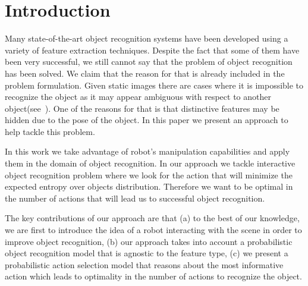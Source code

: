 \section{Introduction}


    Many state-of-the-art object recognition systems have been developed using a variety of feature extraction techniques. Despite the fact that some of them have been very successful, we still cannot say that the problem of object recognition has been solved. We claim that the reason for that is already included in the problem formulation. Given static images there are cases where it is impossible to recognize the object as it may appear ambiguous with respect to another object(see~). One of the reasons for that is that distinctive features may be hidden due to the pose of the object.  In this paper we present an approach to help tackle this problem.
    
    In this work we take advantage of robot's manipulation capabilities and apply them in the domain of object recognition. In our approach we tackle interactive object recognition problem where we look for the action that will minimize the expected entropy over objects distribution. Therefore we want to be optimal in the number of actions that will lead us to successful object recognition.

    The key contributions of our approach are that (a) to the best of our knowledge, we are first to introduce the idea of a robot interacting with the scene in order to improve object recognition, (b) our approach takes into account a probabilistic object recognition model that is agnostic to the feature type, (c) we present a probabilistic action selection model that reasons about the most informative action which leads to optimality in the number of actions to recognize the object.

